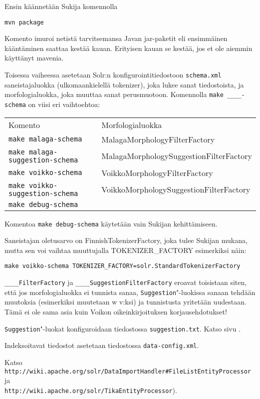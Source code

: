 \documentclass[12pt,a4paper]{scrartcl}
\begin{document}
Ensin käännetään Sukija komennolla

\verb=mvn package=

Komento imuroi netistä tarvitsemansa Javan jar-paketit eli ensimmäinen
kääntäminen saattaa kestää kauan. Erityisen kauan se kestää, jos et
ole aiemmin käyttänyt mavenia.

\bigskip Toisessa vaiheessa asetetaan Solr:n konfigurointitiedostoon
\verb=schema.xml= saneistajaluokka (ulkomaankielellä tokenizer), joka
lukee sanat tiedostoista, ja morfologialuokka, joka muuttaa sanat
perusmuotoon. Komennolla \verb|make ____-schema| on viisi eri
vaihtoehtoa:

\begin{tabular}{@{}ll}
Komento                              & Morfologialuokka \\
\verb=make malaga-schema=            & MalagaMorphologyFilterFactory \\
\verb=make malaga-suggestion-schema= & MalagaMorphologySuggestionFilterFactory \\
\verb=make voikko-schema=            & VoikkoMorphologyFilterFactory \\
\verb=make voikko-suggestion-schema= & VoikkoMorphologySuggestionFilterFactory \\
\verb=make debug-schema=             &
\end{tabular}

Komentoa \verb=make debug-schema= käytetään vain Sukijan
kehittämiseen.

Saneistajan oletusarvo on FinnishTokenizerFactory, joka tulee Sukijan
mukana, mutta sen voi vaihtaa muuttujalla TOKENIZER\_FACTORY
esimerkiksi näin:

\verb|make voikko-schema TOKENIZER_FACTORY=solr.StandardTokenizerFactory|

\verb=____FilterFactory= ja \verb=____SuggestionFilterFactory= eroavat
toisistaan siten, että jos morfologialuokka ei tunnista sanaa,
\verb=Suggestion="-luokissa sanaan tehdään muutoksia (esimerkiksi
muutetaan w v:ksi) ja tunnistusta yritetään uudestaan. Tämä ei ole
sama asia kuin Voikon oikeinkirjoituksen korjausehdotukset!

\verb=Suggestion="-luokat konfiguroidaan tiedostossa
\verb|suggestion.txt|. Katso sivu .

\bigskip
Indeksoitavat tiedostot asetetaan tiedostossa \verb|data-config.xml|.

Katso \\
\verb|http://wiki.apache.org/solr/DataImportHandler#FileListEntityProcessor| \\
ja \\
\verb|http://wiki.apache.org/solr/TikaEntityProcessor|).
\end{document}
